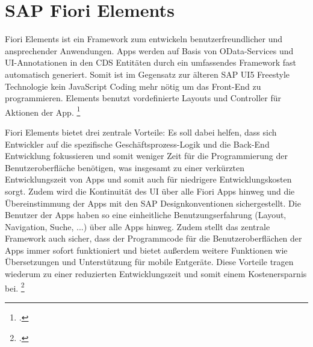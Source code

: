 \section{SAP Fiori Elements}

Fiori Elements ist ein Framework zum entwickeln benutzerfreundlicher und ansprechender Anwendungen. Apps werden auf Basis von OData-Services und UI-Annotationen in den CDS Entitäten durch ein umfassendes Framework fast automatisch generiert. Somit ist im Gegensatz zur älteren SAP UI5 Freestyle Technologie kein JavaScript Coding mehr nötig um das Front-End zu programmieren. Elements benutzt vordefinierte Layouts und Controller für Aktionen der App. \footcite[Vgl.][]{sap_ui5-docu_2022}

Fiori Elements bietet drei zentrale Vorteile: Es soll dabei helfen, dass sich Entwickler auf die spezifische Geschäftsprozess-Logik und die Back-End Entwicklung fokussieren und somit weniger Zeit für die Programmierung der Benutzeroberfläche benötigen, was insgesamt zu einer verkürzten Entwicklungszeit von Apps und somit auch für niedrigere Entwicklungskosten sorgt. Zudem wird die Kontinuität des UI über alle Fiori Apps hinweg und die Übereinstimmung der Apps mit den SAP Designkonventionen sichergestellt. Die Benutzer der Apps haben so eine einheitliche Benutzungserfahrung (Layout, Navigation, Suche, ...) über alle Apps hinweg. Zudem stellt das zentrale Framework auch sicher, dass der Programmcode für die Benutzeroberflächen der Apps immer sofort funktioniert und bietet au{\ss}erdem weitere Funktionen wie Übersetzungen und Unterstützung für mobile Entgeräte. Diese Vorteile tragen wiederum zu einer reduzierten Entwicklungszeit und somit einem Kostenersparnis bei. \footcite[Vgl.][]{sap_ui5-docu_2022}

